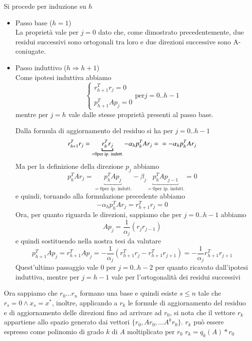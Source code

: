 \begin{thproof}

Si procede per induzione su $h$
\begin{itemize}
\item Passo base ($h=1$)\\ La proprietà vale per $j=0$ dato che, come
dimostrato precedentemente, due residui successivi sono ortogonali tra
loro e due direzioni successive sono A-coniugate.
\item Passo induttivo ($h \Rightarrow h+1$) \\ Come ipotesi induttiva
abbiamo
$$\left\{
\begin{array}{ll} r_{h+1}^{T} r_{j} = 0\\ \\ p_{h+1}^{T} A p_{j} = 0
\end{array} \right.  \text{per} j=0..h-1
$$
mentre per $j=h$ vale dalle stesse proprietà presenti al passo base.

Dalla formula di aggiornamento del residuo si ha per $j=0..h-1$
$$r_{h+1}^{T}r_{j} =\underbracket{ r_{h}^{T}r_{j}}_{= 0 \text {per ip. indutt.}} - \alpha_{h}p_{h}^{T}Ar_{j}=   \\
=-\alpha_{h}p_{h}^{T}Ar_{j}
$$
Ma per la definizione della direzione $p_{j}$ abbiamo
$$
p_{h}^{T}Ar_{j}=\underbracket{p_{h}^{T}Ap_{j}}_{=0 \text{per
ip. indutt.}} - \beta_{j}\underbracket{p_{h}^{T}Ap_{j-1}}_{=0
\text{per ip. indutt.}} = 0
$$
e quindi, tornando alla formulazione precedente abbiamo
$$
-\alpha_{h}p_{h}^{T}Ar_{j}=r_{h+1}^{T} r_{j} = 0
$$
Ora, per quanto riguarda le direzioni, sappiamo che per $j=0..h-1$
abbiamo
$$Ap_{j}=\frac{1}{\alpha_{j}}(r_{j}r_{j-1})$$
e quindi sostituendo nella nostra tesi da valutare
$$p_{h+1}^{T}Ap_{j}=r_{h+1}^{T}Ap_{j}=-\frac{1}{\alpha_{j}}(r_{h+1}^{T}r_{j}-r_{h+1}^{T}r_{j+1})=-\frac{1}{\alpha_{j}}r_{h+1}^{T}r_{j+1}$$
Quest'ultimo passaggio vale 0 per $j=0..h-2$ per quanto ricavato
dall'ipotesi induttiva, mentre per $j=h-1$ vale per l'ortogonalità dei
residui successivi
\end{itemize}
\end{thproof} Ora sappiamo che $r_{0}... r_{n}$ formano una base e
quindi esiste $s \leq n$ tale che $r_{s} = 0 \wedge x_{s} = x^{*} $,
inoltre, applicando a $r_{k}$ le formule di aggiornamento del residuo
e di aggiornamento delle direzioni fino ad arrivare ad $r_{0}$, si
nota che il vettore $r_{k}$ appartiene allo spazio generato dai
vettori $\{ r_{0}, Ar_{0}, ... A^{k}r_{0} \}$.  $r_{k}$ può essere
espresso come polinomio di grado $k$ di $A$ moltiplicato per $r_{0}$
$r_{k}=q_{k}(A)*r_{0}$

